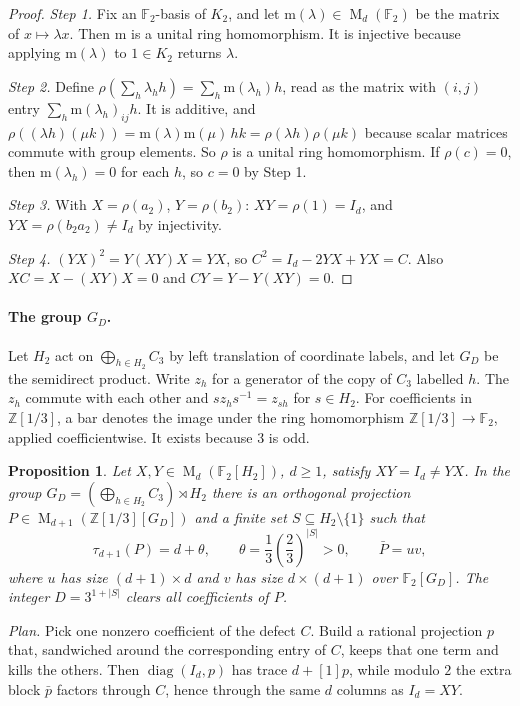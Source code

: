 \documentclass[11pt]{article}
\newtheorem{proposition}[theorem]{Proposition}
\theoremstyle{remark}
\numberwithin{equation}{section}
\newcommand{\F}{\mathbb F}
\newcommand{\Z}{\mathbb Z}
\newcommand{\Mat}{\operatorname{M}}
\newcommand{\diag}{\operatorname{diag}}
\begin{document}
\begin{proof}
\emph{Step 1.} Fix an $\F_2$-basis of $K_2$, and let $\mathrm m(\lambda)\in\Mat_d(\F_2)$ be the matrix of $x\mapsto\lambda x$. Then $\mathrm m$ is a unital ring homomorphism. It is injective because applying $\mathrm m(\lambda)$ to $1\in K_2$ returns $\lambda$.

\emph{Step 2.} Define $\rho(\sum_h\lambda_hh)=\sum_h\mathrm m(\lambda_h)h$, read as the matrix with $(i,j)$ entry $\sum_h\mathrm m(\lambda_h)_{ij}h$. It is additive, and $\rho((\lambda h)(\mu k))=\mathrm m(\lambda)\mathrm m(\mu)\,hk=\rho(\lambda h)\rho(\mu k)$ because scalar matrices commute with group elements. So $\rho$ is a unital ring homomorphism. If $\rho(c)=0$, then $\mathrm m(\lambda_h)=0$ for each $h$, so $c=0$ by Step 1.

\emph{Step 3.} With $X=\rho(a_2)$, $Y=\rho(b_2)$: $XY=\rho(1)=I_d$, and $YX=\rho(b_2a_2)\ne I_d$ by injectivity.

\emph{Step 4.} $(YX)^2=Y(XY)X=YX$, so $C^2=I_d-2YX+YX=C$. Also $XC=X-(XY)X=0$ and $CY=Y-Y(XY)=0$.
\end{proof}

\paragraph{The group $G_D$.} Let $H_2$ act on $\bigoplus_{h\in H_2}C_3$ by left translation of coordinate labels, and let $G_D$ be the semidirect product. Write $z_h$ for a generator of the copy of $C_3$ labelled $h$. The $z_h$ commute with each other and $s z_hs^{-1}=z_{sh}$ for $s\in H_2$. For coefficients in $\Z[1/3]$, a bar denotes the image under the ring homomorphism $\Z[1/3]\to\F_2$, applied coefficientwise. It exists because $3$ is odd.

\begin{proposition}\label{prop:separation}
Let $X,Y\in\Mat_d(\F_2[H_2])$, $d\ge1$, satisfy
$XY=I_d\ne YX$. In the group
$G_D=(\bigoplus_{h\in H_2}C_3)\rtimes H_2$ there is an orthogonal
projection $P\in\Mat_{d+1}(\Z[1/3][G_D])$ and a finite set
$S\subseteq H_2\setminus\{1\}$ such that
\[
 \tau_{d+1}(P)=d+\theta,\qquad
 \theta=\frac13\left(\frac23\right)^{|S|}>0,
 \qquad \bar P=uv,
\]
where $u$ has size $(d+1)\times d$ and $v$ has size $d\times(d+1)$
over $\F_2[G_D]$. The integer $D=3^{1+|S|}$ clears all coefficients
of $P$.
\end{proposition}

\emph{Plan.} Pick one nonzero coefficient of the defect $C$. Build a rational projection $p$ that, sandwiched around the corresponding entry of $C$, keeps that one term and kills the others. Then $\diag(I_d,p)$ has trace $d+[1]p$, while modulo $2$ the extra block $\bar p$ factors through $C$, hence through the same $d$ columns as $I_d=XY$.
\end{document}
